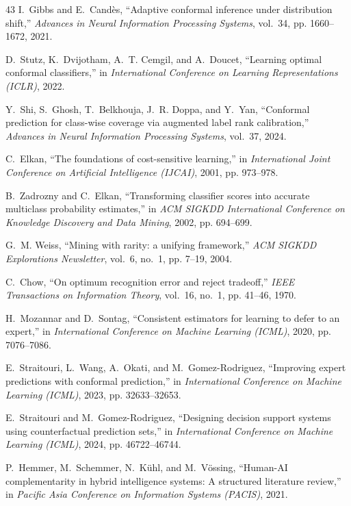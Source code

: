 \documentclass{ieeetj}
\begin{document}
\begin{thebibliography}{43}
I.~Gibbs and E.~Cand{\`e}s, ``Adaptive conformal inference under distribution shift,'' \emph{Advances in Neural Information Processing Systems}, vol.~34, pp. 1660--1672, 2021.

D.~Stutz, K.~Dvijotham, A.~T. Cemgil, and A.~Doucet, ``Learning optimal conformal classifiers,'' in \emph{International Conference on Learning Representations (ICLR)}, 2022.

Y.~Shi, S.~Ghosh, T.~Belkhouja, J.~R. Doppa, and Y.~Yan, ``Conformal prediction for class-wise coverage via augmented label rank calibration,'' \emph{Advances in Neural Information Processing Systems}, vol.~37, 2024.

C.~Elkan, ``The foundations of cost-sensitive learning,'' in \emph{International Joint Conference on Artificial Intelligence (IJCAI)}, 2001, pp. 973--978.

B.~Zadrozny and C.~Elkan, ``Transforming classifier scores into accurate multiclass probability estimates,'' in \emph{ACM SIGKDD International Conference on Knowledge Discovery and Data Mining}, 2002, pp. 694--699.

G.~M. Weiss, ``Mining with rarity: a unifying framework,'' \emph{ACM SIGKDD Explorations Newsletter}, vol.~6, no.~1, pp. 7--19, 2004.

C.~Chow, ``On optimum recognition error and reject tradeoff,'' \emph{IEEE Transactions on Information Theory}, vol.~16, no.~1, pp. 41--46, 1970.

H.~Mozannar and D.~Sontag, ``Consistent estimators for learning to defer to an expert,'' in \emph{International Conference on Machine Learning (ICML)}, 2020, pp. 7076--7086.

E.~Straitouri, L.~Wang, A.~Okati, and M.~Gomez-Rodriguez, ``Improving expert predictions with conformal prediction,'' in \emph{International Conference on Machine Learning (ICML)}, 2023, pp. 32633--32653.

E.~Straitouri and M.~Gomez-Rodriguez, ``Designing decision support systems using counterfactual prediction sets,'' in \emph{International Conference on Machine Learning (ICML)}, 2024, pp. 46722--46744.

P.~Hemmer, M.~Schemmer, N.~K{\"u}hl, and M.~V{\"o}ssing, ``Human-AI complementarity in hybrid intelligence systems: A structured literature review,'' in \emph{Pacific Asia Conference on Information Systems (PACIS)}, 2021.


\end{thebibliography}
\end{document}
